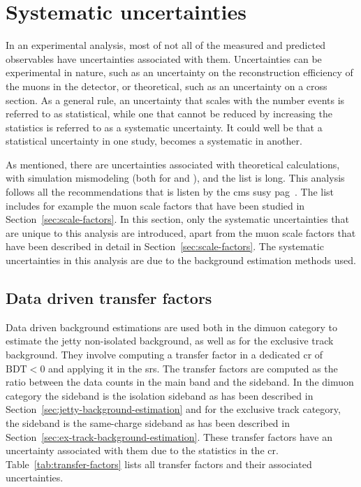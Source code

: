 \clearpage
\section{Systematic uncertainties}
\label{sec:systematic-uncertainties}

In an experimental analysis, most of not all of the measured and predicted observables have uncertainties associated with them. Uncertainties can be experimental in nature, such as an uncertainty on the reconstruction efficiency of the muons in the detector, or theoretical, such as an uncertainty on a cross section. As a general rule, an uncertainty that scales with the number events is referred to as statistical, while one that cannot be reduced by increasing the statistics is referred to as a systematic uncertainty. It could well be that a statistical uncertainty in one study, becomes a systematic in another.

As mentioned, there are uncertainties associated with theoretical calculations, with simulation mismodeling (both for \FASTSIM and \FULLSIM), and the list is long. This analysis follows all the recommendations that is listen by the \gls{cms} \gls{susy} \gls{pag}~\cite{sus-pag-recommendations}. The list includes for example the muon scale factors that have been studied in Section~\ref{sec:scale-factors}. In this section, only the systematic uncertainties that are unique to this analysis are introduced, apart from the muon scale factors that have been described in detail in Section~\ref{sec:scale-factors}. The systematic uncertainties in this analysis are due to the background estimation methods used. 

\subsection{Data driven transfer factors}
\label{sec:data-driven-tranfer-factors}

Data driven background estimations are used both in the dimuon category to estimate the jetty non-isolated background, as well as for the exclusive track background. They involve computing a transfer factor in a dedicated \gls{cr} of $\text{BDT}<0$ and applying it in the \glspl{sr}. The transfer factors are computed as the ratio between the data counts in the main band and the sideband. In the dimuon category the sideband is the isolation sideband as has been described in Section~\ref{sec:jetty-background-estimation} and for the exclusive track category, the sideband is the same-charge sideband as has been described in Section~\ref{sec:ex-track-background-estimation}. These transfer factors have an uncertainty associated with them due to the statistics in the \gls{cr}. Table~\ref{tab:transfer-factors} lists all transfer factors and their associated uncertainties.

